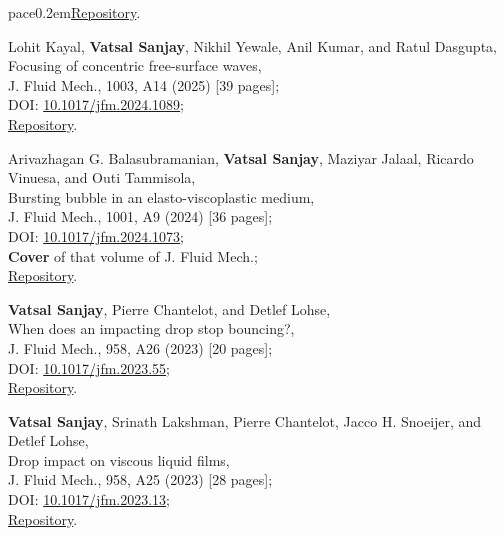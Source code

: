 pace{0.2em}\href{https://github.com/VatsalSy/The-role-of-viscosity-on-drop-impact-forces}{Repository}.

	\item Lohit Kayal, \textbf{Vatsal Sanjay}, Nikhil Yewale, Anil Kumar, and Ratul Dasgupta,\\
	Focusing of concentric free-surface waves,\\
	J. Fluid Mech., 1003, A14 (2025) [39 pages];\\
	\faFile\hspace{0.2em}DOI: \href{https://doi.org/10.1017/jfm.2024.1089}{10.1017/jfm.2024.1089};\\
	\faGithub\hspace{0.2em}\href{https://github.com/comphy-lab/concentricWave}{Repository}.

	\item Arivazhagan G. Balasubramanian, \textbf{Vatsal Sanjay}, Maziyar Jalaal, Ricardo Vinuesa, and Outi Tammisola,\\
	Bursting bubble in an elasto-viscoplastic medium,\\
	J. Fluid Mech., 1001, A9 (2024) [36 pages];\\
	\faFile\hspace{0.2em}DOI: \href{https://doi.org/10.1017/jfm.2024.1073}{10.1017/jfm.2024.1073};\\
	\faStar\hspace{0.2em}\textbf{Cover} of that volume of J. Fluid Mech.;\\
	\faGithub\hspace{0.2em}\href{https://github.com/comphy-lab/2023_Bubble-bursting-in-an-elasto-viscoplastic-medium}{Repository}.

	\item \textbf{Vatsal Sanjay}, Pierre Chantelot, and Detlef Lohse,\\
	When does an impacting drop stop bouncing?,\\
	J. Fluid Mech., 958, A26 (2023) [20 pages];\\
	\faFile\hspace{0.2em}DOI: \href{https://doi.org/10.1017/jfm.2023.55}{10.1017/jfm.2023.55};\\
	\faGithub\hspace{0.2em}\href{https://github.com/comphy-lab/Drop-Impact}{Repository}.

	\item \textbf{Vatsal Sanjay}, Srinath Lakshman, Pierre Chantelot, Jacco H. Snoeijer, and Detlef Lohse,\\
	Drop impact on viscous liquid films,\\
	J. Fluid Mech., 958, A25 (2023) [28 pages];\\
	\faFile\hspace{0.2em}DOI: \href{https://doi.org/10.1017/jfm.2023.13}{10.1017/jfm.2023.13};\\
	\faGithub\hspace{0.2em}\href{https://github.com/VatsalSy/Drop-impact-on-viscous-liquid-films}{Repository}.

